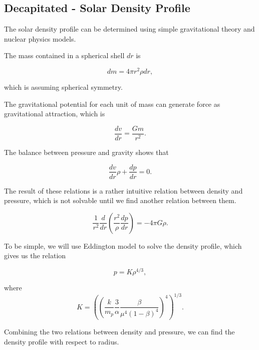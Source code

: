 \documentclass{tufte-handout}
\begin{document}

\subsection{Decapitated - Solar Density Profile}



The solar density profile can be determined using simple gravitational theory and nuclear physics models.

The mass contained in a spherical shell $dr$ is

\begin{equation}
    dm = 4\pi r^2 \rho dr ,
\end{equation}

which is assuming spherical symmetry.

The gravitational potential for each unit of mass can generate force as gravitational attraction, which is

\begin{equation*}
    \frac{dv}{dr} = \frac{G m}{r^2}.
\end{equation*}

The balance between pressure and gravity shows that

\begin{equation*}
    \frac{dv}{dr} \rho + \frac{dp}{dr} = 0.
\end{equation*}

The result of these relations is a rather intuitive relation between density and pressure, which is not solvable until we find another relation between them.

\begin{equation*}
    \frac{1}{r^2} \frac{d}{dr} \left( \frac{r^2}{\rho} \frac{dp}{dr} \right) = -4\pi G\rho.
\end{equation*}

To be simple, we will use Eddington model to solve the density profile, which gives us the relation

\begin{equation*}
    p = K \rho^{4/3},
\end{equation*}


where 
\begin{equation*}
    K = \left(  \left( \frac{k}{m_p} \frac{3}{\alpha} \frac{\beta}{\mu^4(1-\beta)^4}  \right)^4  \right)^{1/3}.
\end{equation*}

Combining the two relations between density and pressure, we can find the density profile with respect to radius.








\end{document}
